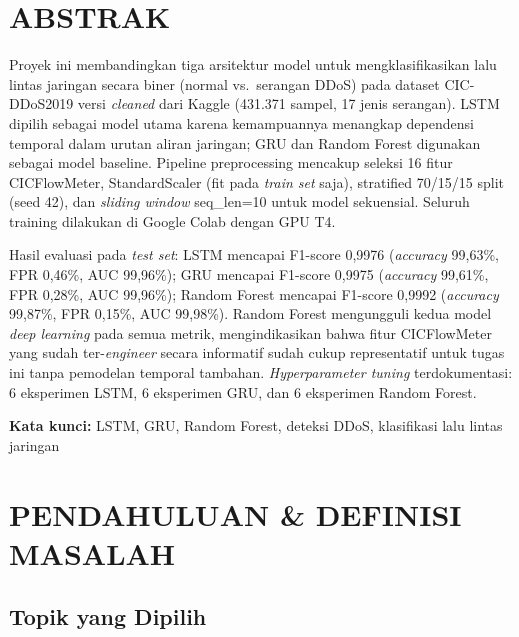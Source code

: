 \documentclass[11pt,a4paper,oneside]{report}
\begin{document}
\chapter*{ABSTRAK}

Proyek ini membandingkan tiga arsitektur model untuk mengklasifikasikan lalu lintas jaringan secara biner (normal vs.\ serangan DDoS) pada dataset CIC-DDoS2019 versi \textit{cleaned} dari Kaggle (431.371 sampel, 17 jenis serangan). LSTM dipilih sebagai model utama karena kemampuannya menangkap dependensi temporal dalam urutan aliran jaringan; GRU dan Random Forest digunakan sebagai model baseline. Pipeline preprocessing mencakup seleksi 16 fitur CICFlowMeter, StandardScaler (fit pada \textit{train set} saja), stratified 70/15/15 split (seed 42), dan \textit{sliding window} seq\_len=10 untuk model sekuensial. Seluruh training dilakukan di Google Colab dengan GPU T4.

Hasil evaluasi pada \textit{test set}: LSTM mencapai F1-score 0,9976 (\textit{accuracy} 99,63\%, FPR 0,46\%, AUC 99,96\%); GRU mencapai F1-score 0,9975 (\textit{accuracy} 99,61\%, FPR 0,28\%, AUC 99,96\%); Random Forest mencapai F1-score 0,9992 (\textit{accuracy} 99,87\%, FPR 0,15\%, AUC 99,98\%). Random Forest mengungguli kedua model \textit{deep learning} pada semua metrik, mengindikasikan bahwa fitur CICFlowMeter yang sudah ter-\textit{engineer} secara informatif sudah cukup representatif untuk tugas ini tanpa pemodelan temporal tambahan. \textit{Hyperparameter tuning} terdokumentasi: 6 eksperimen LSTM, 6 eksperimen GRU, dan 6 eksperimen Random Forest.

\vspace{1em}
\noindent\textbf{Kata kunci:} LSTM, GRU, Random Forest, deteksi DDoS, klasifikasi lalu lintas jaringan

\chapter{PENDAHULUAN \& DEFINISI MASALAH}
\label{bab:pendahuluan}

\section{Topik yang Dipilih}
\end{document}
